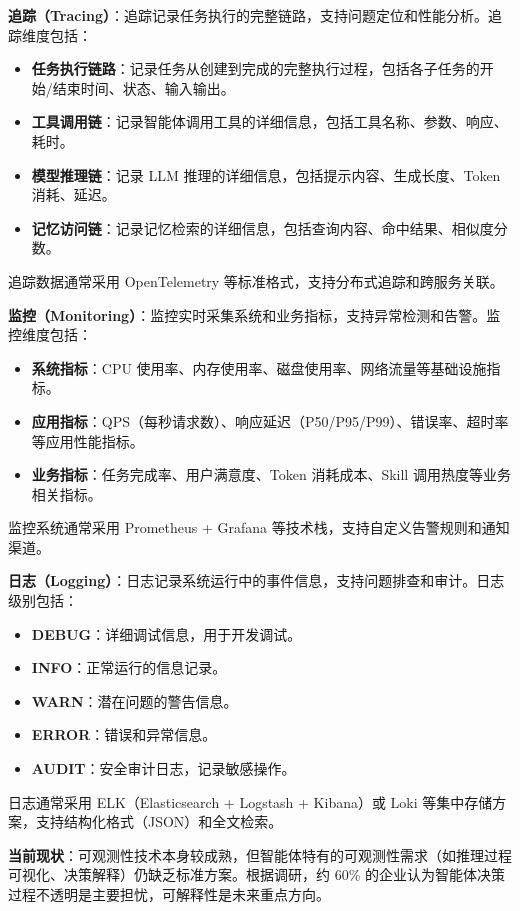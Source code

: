 \documentclass[12pt,a4paper]{article}
\begin{document}
\textbf{追踪（Tracing）}：追踪记录任务执行的完整链路，支持问题定位和性能分析。追踪维度包括：
\begin{itemize}
    \item \textbf{任务执行链路}：记录任务从创建到完成的完整执行过程，包括各子任务的开始/结束时间、状态、输入输出。
    \item \textbf{工具调用链}：记录智能体调用工具的详细信息，包括工具名称、参数、响应、耗时。
    \item \textbf{模型推理链}：记录 LLM 推理的详细信息，包括提示内容、生成长度、Token 消耗、延迟。
    \item \textbf{记忆访问链}：记录记忆检索的详细信息，包括查询内容、命中结果、相似度分数。
\end{itemize}

追踪数据通常采用 OpenTelemetry 等标准格式，支持分布式追踪和跨服务关联。

\textbf{监控（Monitoring）}：监控实时采集系统和业务指标，支持异常检测和告警。监控维度包括：
\begin{itemize}
    \item \textbf{系统指标}：CPU 使用率、内存使用率、磁盘使用率、网络流量等基础设施指标。
    \item \textbf{应用指标}：QPS（每秒请求数）、响应延迟（P50/P95/P99）、错误率、超时率等应用性能指标。
    \item \textbf{业务指标}：任务完成率、用户满意度、Token 消耗成本、Skill 调用热度等业务相关指标。
\end{itemize}

监控系统通常采用 Prometheus + Grafana 等技术栈，支持自定义告警规则和通知渠道。

\textbf{日志（Logging）}：日志记录系统运行中的事件信息，支持问题排查和审计。日志级别包括：
\begin{itemize}
    \item \textbf{DEBUG}：详细调试信息，用于开发调试。
    \item \textbf{INFO}：正常运行的信息记录。
    \item \textbf{WARN}：潜在问题的警告信息。
    \item \textbf{ERROR}：错误和异常信息。
    \item \textbf{AUDIT}：安全审计日志，记录敏感操作。
\end{itemize}

日志通常采用 ELK（Elasticsearch + Logstash + Kibana）或 Loki 等集中存储方案，支持结构化格式（JSON）和全文检索。

\textbf{当前现状}：可观测性技术本身较成熟，但智能体特有的可观测性需求（如推理过程可视化、决策解释）仍缺乏标准方案。根据调研，约 60\% 的企业认为智能体决策过程不透明是主要担忧，可解释性是未来重点方向。
\end{document}

